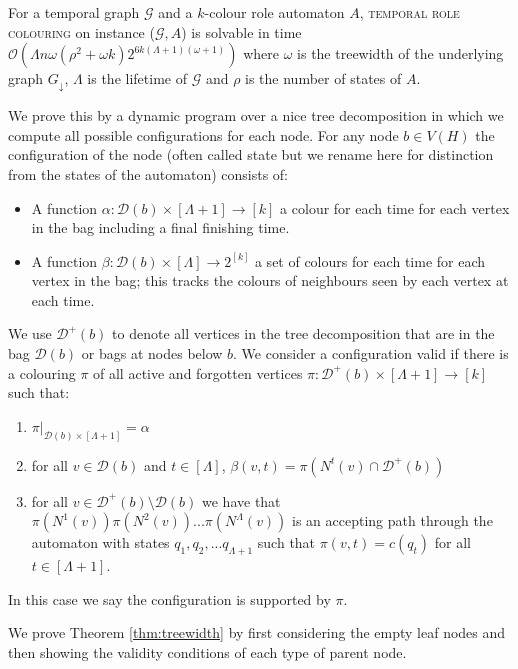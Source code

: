 \documentclass[runningheads]{llncs}
\begin{document}
\begin{theorem} \label{thm:treewidth}
    For a temporal graph $\mathcal{G}$ and a $k$-colour role automaton $A$, \textsc{temporal role colouring} on instance ($\mathcal{G},A$) is solvable in time $\mathcal{O}(\Lambda n\omega(\rho^2+\omega k)2^{6k(\Lambda+1)(\omega+1)})$ where $\omega$ is the treewidth of the underlying graph $G_{\downarrow}$, $\Lambda$ is the lifetime of $\mathcal{G}$ and $\rho$ is the number of states of $A$.
\end{theorem}
We prove this by a dynamic program over a nice tree decomposition in which we compute all possible configurations for each node.
For any node $b\in V(H)$ the configuration of the node (often called state but we rename here for distinction from the states of the automaton) consists of:
\begin{itemize}
    \item A function $\alpha:\mathcal{D}(b) \times [\Lambda+1] \rightarrow [k]$ a colour for each time for each vertex in the bag including a final finishing time.
    \item A function $\beta: \mathcal{D}(b) \times [\Lambda] \rightarrow 2^{[k]}$ a set of colours for each time for each vertex in the bag; this tracks the colours of neighbours seen by each vertex at each time. 
\end{itemize}

We use $\mathcal{D}^+(b)$ to denote all vertices in the tree decomposition that are in the bag $\mathcal{D}(b)$ or bags at nodes below $b$. We consider a configuration valid if there is a colouring $\pi$ of all active and forgotten vertices $\pi: \mathcal{D}^+(b) \times [\Lambda+1] \rightarrow [k] $ such that:
\begin{enumerate} [label=\roman*.]
    \item $\pi|_{\mathcal{D}(b) \times [\Lambda+1]}=\alpha$
    \item for all $v \in \mathcal{D}(b)$ and $t \in [\Lambda]$, $\beta(v,t)=\pi(N^t(v)\cap\mathcal{D}^+(b))$
    \item for all $v \in \mathcal{D}^+(b) \setminus \mathcal{D}(b)$ we have that $ \pi(N^1(v))\pi(N^2(v))...\pi(N^\Lambda(v))$ is an accepting path through the automaton with states $q_1,q_2,...q_{\Lambda+1}$ such that $\pi(v,t)=c(q_t)$ for all $t \in [\Lambda+1]$.
\end{enumerate}
In this case we say the configuration is supported by $\pi$.

We prove Theorem \ref{thm:treewidth} by first considering the empty leaf nodes and then showing the validity conditions of each type of parent node.
\end{document}
